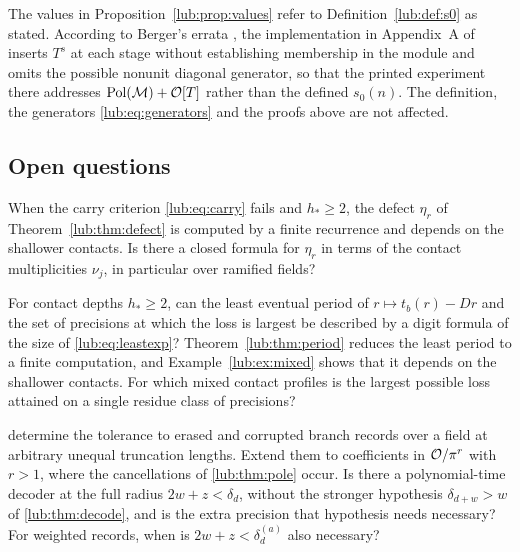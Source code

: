 \begin{remark}\label{lub:rem:baseline}
The values in Proposition~\ref{lub:prop:values} refer to Definition~\ref{lub:def:s0} as stated. According to
Berger's errata \cite[Section~19]{Berger2026Errata}, the implementation in Appendix~A of
\cite{BergerSprang2025Integer} inserts $T^s$ at each stage without establishing membership
in the module and omits the possible nonunit diagonal generator, so that the printed
experiment there addresses $\operatorname{Pol}(\mathcal M)+\mathcal{O}[T]$ rather than the defined
$s_0(n)$. The definition, the generators \eqref{lub:eq:generators} and the proofs above are
not affected.
\end{remark}

\subsection{Open questions}\label{lub:ssec:open}
\begingroup\raggedright{}\endgroup

\begin{question}\label{lub:q:closed}
When the carry criterion \eqref{lub:eq:carry} fails and $h_*\ge2$, the defect $\eta_r$ of
Theorem~\ref{lub:thm:defect} is computed by a finite recurrence and depends on the shallower
contacts. Is there a closed formula for $\eta_r$ in terms of the contact multiplicities
$\nu_j$, in particular over ramified fields?
\end{question}

\begin{question}\label{lub:q:period}
For contact depths $h_*\ge2$, can the least eventual period of $r\mapsto t_b(r)-Dr$ and the set
of precisions at which the loss is largest be described by a digit formula of the size of
\eqref{lub:eq:leastexp}? Theorem~\ref{lub:thm:period} reduces the least period to a finite
computation, and Example~\ref{lub:ex:mixed} shows that it depends on the shallower contacts.
For which mixed contact profiles is the largest possible loss attained on a single residue
class of precisions?
\end{question}

\begin{question}\label{lub:q:adversarial}
 determine the tolerance to erased and
corrupted branch records over a field at arbitrary unequal truncation lengths. Extend them to
coefficients in $\mathcal{O}/\pi^r$ with $r>1$, where the cancellations of \cref{lub:thm:pole} occur. Is there
a polynomial-time decoder at the full radius $2w+z<\delta_d$, without the stronger hypothesis
$\delta_{d+w}>w$ of \cref{lub:thm:decode}, and is the extra precision that hypothesis needs necessary?
For weighted records, when is $2w+z<\delta_d^{(a)}$ also necessary?
\end{question}

